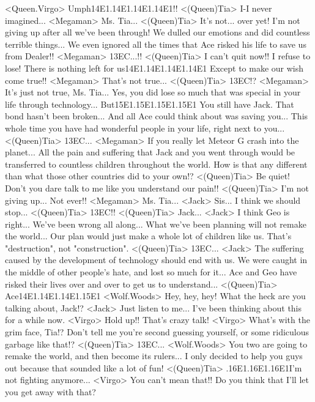 <Queen.Virgo> Umph{14}{E1}.{14}{E1}.{14}{E1}.{14}{E1}!! 
<(Queen)Tia> I-I never imagined... 
<Megaman> Ms. Tia... 
<(Queen)Tia> It's not... over yet! 
I'm not giving up after all we've been through! 
We dulled our emotions and did countless terrible things... 
We even ignored all the times that Ace risked his life to save us from Dealer!! 
<Megaman> {13}{EC}...!! 
<(Queen)Tia> I can't quit now!! I refuse to lose! 
There is nothing left for us{14}{E1}.{14}{E1}.{14}{E1}.{14}{E1} 
Except to make our wish come true!! 
<Megaman> That's not true... 
<(Queen)Tia> {13}{EC}!? 
<Megaman> It's just not true, Ms. Tia... 
Yes, you did lose so much that was special in your life through technology... 
But{15}{E1}.{15}{E1}.{15}{E1}.{15}{E1} You still have Jack. That bond hasn't been broken... 
And all Ace could think about was saving you... 
This whole time you have had wonderful people in your life, right next to you... 
<(Queen)Tia> {13}{EC}... 
<Megaman> If you really let Meteor G crash into the planet... 
All the pain and suffering that Jack and you went 
through would be transferred to countless children throughout the world. 
How is that any different than what those other countries did to your own!? 
<(Queen)Tia> Be quiet! 
Don't you dare talk to me like you understand our pain!! 
<(Queen)Tia> I'm not giving up... Not ever!! 
<Megaman> Ms. Tia... 
<Jack> Sis... 
I think we should stop... 
<(Queen)Tia> {13}{EC}!! 
<(Queen)Tia> Jack... 
<Jack> I think Geo is right... 
We've been wrong all along... 
What we've been planning will not remake the world... 
Our plan would just make a whole lot of children like us. 
That's "destruction", not "construction". 
<(Queen)Tia> {13}{EC}... 
<Jack> The suffering caused by the development of technology should end with us. 
We were caught in the middle of other people's hate, and lost so much for it... 
Ace and Geo have risked their lives over and over to get us to understand... 
<(Queen)Tia> Ace{14}{E1}.{14}{E1}.{14}{E1}.{15}{E1} 
<Wolf.Woods> Hey, hey, hey! 
What the heck are you talking about, Jack!? 
<Jack> Just listen to me... I've been thinking about this for a while now. 
<Virgo> Hold up!! That's crazy talk! 
<Virgo> What's with the grim face, Tia!? 
Don't tell me you're second guessing yourself, or some ridiculous garbage like that!? 
<(Queen)Tia> {13}{EC}... 
<Wolf.Woods> You two are going to remake the world, and then become its rulers... 
I only decided to help you guys out because that sounded like a lot of fun! 
<(Queen)Tia> .{16}{E1}.{16}{E1}.{16}{E1}I'm not fighting anymore... 
<Virgo> You can't mean that!! 
Do you think that I'll let you get away with that? 
